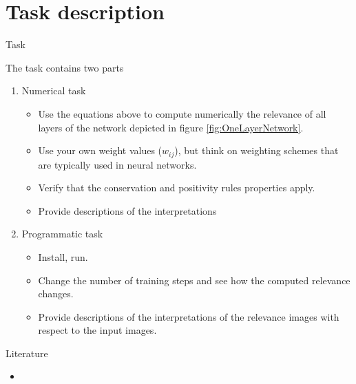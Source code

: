\documentclass{beamer}
\begin{document}
\section{Task description}

\begin{frame}{Task}

The task contains two parts
\begin{enumerate}
\item Numerical task
	\begin{itemize}
		\item Use the equations above to compute numerically the relevance of all layers of the network depicted in figure \ref{fig:OneLayerNetwork}.
		\item Use your own weight values ($w_{ij}$), but think on weighting schemes that are typically used in neural networks.
		\item Verify that the conservation and positivity rules properties apply.
		\item Provide descriptions of the interpretations
	\end{itemize}
\item Programmatic task
	\begin{itemize}
		\item Install, run.
		\item Change the number of training steps and see how the computed relevance changes.
		\item Provide descriptions of the interpretations of the relevance images with respect to the input images.
	\end{itemize}
\end{enumerate}

\end{frame}

\begin{frame}{Literature}

\begin{itemize}
	\item 
\end{itemize}

\end{frame}
\end{document}
